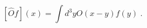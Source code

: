 \begin{equation}
\left[ \widehat{O}f\right] (x)=\int d^{3}yO(x-y)f(y)\;.  \label{odf}
\end{equation}

